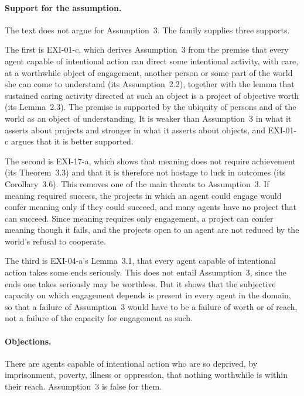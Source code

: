 \paragraph{Support for the assumption.} The text does not argue for Assumption~3. The family supplies three supports.

The first is EXI-01-c, which derives Assumption~3 from the premise that every agent capable of intentional action can direct some intentional activity, with care, at a worthwhile object of engagement, another person or some part of the world she can come to understand (its Assumption~2.2), together with the lemma that sustained caring activity directed at such an object is a project of objective worth (its Lemma~2.3). The premise is supported by the ubiquity of persons and of the world as an object of understanding. It is weaker than Assumption~3 in what it asserts about projects and stronger in what it asserts about objects, and EXI-01-c argues that it is better supported.

The second is EXI-17-a, which shows that meaning does not require achievement (its Theorem~3.3) and that it is therefore not hostage to luck in outcomes (its Corollary~3.6). This removes one of the main threats to Assumption~3. If meaning required success, the projects in which an agent could engage would confer meaning only if they could succeed, and many agents have no project that can succeed. Since meaning requires only engagement, a project can confer meaning though it fails, and the projects open to an agent are not reduced by the world's refusal to cooperate.

The third is EXI-04-a's Lemma~3.1, that every agent capable of intentional action takes some ends seriously. This does not entail Assumption~3, since the ends one takes seriously may be worthless. But it shows that the subjective capacity on which engagement depends is present in every agent in the domain, so that a failure of Assumption~3 would have to be a failure of worth or of reach, not a failure of the capacity for engagement as such.

\paragraph{Objections.}

\begin{objection}\label{o:depriv}
There are agents capable of intentional action who are so deprived, by imprisonment, poverty, illness or oppression, that nothing worthwhile is within their reach. Assumption~3 is false for them.
\end{objection}

